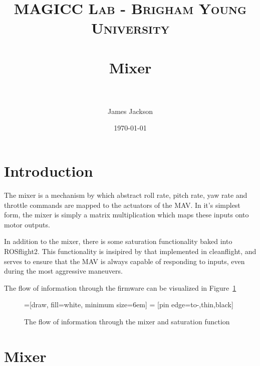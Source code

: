 \documentclass[paper=a4, fontsize=11pt]{scrartcl} %
\title{
\normalfont \normalsize
\textsc{MAGICC Lab - Brigham Young University} \\ [25pt] %
\horrule{0.5pt} \\[0.4cm] %
\huge Mixer \\ %
\horrule{2pt} \\[0.5cm] %
}
\author{James Jackson} %
\date{\normalsize\today} %
\begin{document}
\maketitle %


\section{Introduction}

The mixer is a mechanism by which abstract roll rate, pitch rate, yaw rate and throttle commands are mapped to the actuators of the MAV.  In it's simplest form, the mixer is simply a matrix multiplication which maps these inputs onto motor outputs.

In addition to the mixer, there is some saturation functionality baked into ROSflight2.  This functionality is insipired by that implemented in cleanflight, and serves to ensure that the MAV is always capable of responding to inputs, even during the most aggressive maneuvers.

The flow of information through the firmware can be visualized in Figure~\ref{fig:mixer_flow}

\begin{figure}
	\centering
	=[draw, fill=white, minimum size=6em]
	 = [pin edge={to-,thin,black}]

\label{fig:mixer_flow}
\caption{The flow of information through the mixer and saturation function}
\end{figure}

\section{Mixer}
\end{document}

